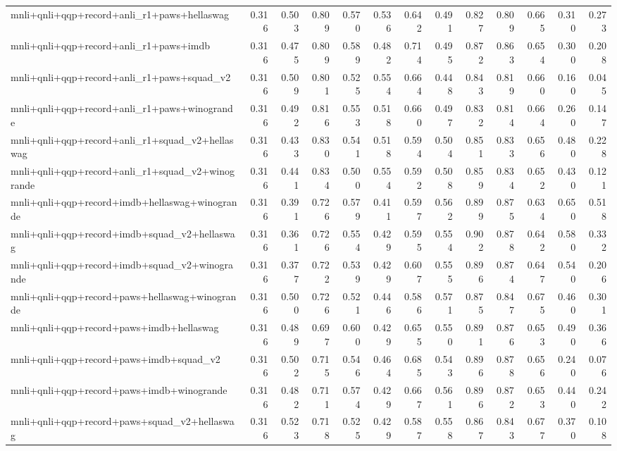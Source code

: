 \begin{table}[t]
\begin{tabular}{lrrrrrrrrrrrr}
    mnli+qnli+qqp+record+anli\_r1+paws+hellaswag & 0.316 & 0.503 & 0.809 & 0.570 & 0.536 & 0.642 & 0.491 & 0.827 & 0.809 & 0.665 & 0.310 & 0.273 \\
    mnli+qnli+qqp+record+anli\_r1+paws+imdb & 0.316 & 0.475 & 0.809 & 0.589 & 0.482 & 0.714 & 0.495 & 0.872 & 0.863 & 0.654 & 0.300 & 0.208 \\
    mnli+qnli+qqp+record+anli\_r1+paws+squad\_v2 & 0.316 & 0.509 & 0.801 & 0.525 & 0.554 & 0.664 & 0.448 & 0.843 & 0.819 & 0.660 & 0.160 & 0.045 \\
    mnli+qnli+qqp+record+anli\_r1+paws+winogrande & 0.316 & 0.492 & 0.816 & 0.553 & 0.518 & 0.660 & 0.497 & 0.832 & 0.814 & 0.664 & 0.260 & 0.147 \\
    mnli+qnli+qqp+record+anli\_r1+squad\_v2+hellaswag & 0.316 & 0.433 & 0.830 & 0.541 & 0.518 & 0.594 & 0.504 & 0.851 & 0.833 & 0.656 & 0.480 & 0.228 \\
    mnli+qnli+qqp+record+anli\_r1+squad\_v2+winogrande & 0.316 & 0.441 & 0.834 & 0.500 & 0.554 & 0.592 & 0.508 & 0.859 & 0.834 & 0.652 & 0.430 & 0.121 \\
    mnli+qnli+qqp+record+imdb+hellaswag+winogrande & 0.316 & 0.391 & 0.726 & 0.579 & 0.411 & 0.597 & 0.562 & 0.899 & 0.875 & 0.634 & 0.650 & 0.518 \\
    mnli+qnli+qqp+record+imdb+squad\_v2+hellaswag & 0.316 & 0.361 & 0.726 & 0.554 & 0.429 & 0.595 & 0.554 & 0.902 & 0.878 & 0.642 & 0.580 & 0.332 \\
    mnli+qnli+qqp+record+imdb+squad\_v2+winogrande & 0.316 & 0.377 & 0.722 & 0.539 & 0.429 & 0.607 & 0.555 & 0.896 & 0.874 & 0.647 & 0.540 & 0.206 \\
    mnli+qnli+qqp+record+paws+hellaswag+winogrande & 0.316 & 0.500 & 0.726 & 0.521 & 0.446 & 0.586 & 0.571 & 0.875 & 0.847 & 0.675 & 0.460 & 0.301 \\
    mnli+qnli+qqp+record+paws+imdb+hellaswag & 0.316 & 0.489 & 0.697 & 0.600 & 0.429 & 0.655 & 0.550 & 0.891 & 0.876 & 0.653 & 0.490 & 0.366 \\
    mnli+qnli+qqp+record+paws+imdb+squad\_v2 & 0.316 & 0.502 & 0.715 & 0.546 & 0.464 & 0.685 & 0.543 & 0.896 & 0.878 & 0.656 & 0.240 & 0.076 \\
    mnli+qnli+qqp+record+paws+imdb+winogrande & 0.316 & 0.482 & 0.711 & 0.574 & 0.429 & 0.667 & 0.561 & 0.896 & 0.872 & 0.653 & 0.440 & 0.242 \\
    mnli+qnli+qqp+record+paws+squad\_v2+hellaswag & 0.316 & 0.523 & 0.718 & 0.525 & 0.429 & 0.587 & 0.558 & 0.867 & 0.843 & 0.677 & 0.370 & 0.108 \\

\end{tabular}
\end{table}
